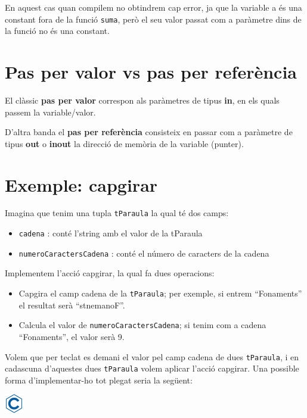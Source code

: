 \documentclass[]{book}
\providecommand{\tightlist}{%
  \setlength{\itemsep}{0pt}\setlength{\parskip}{0pt}}
\begin{document}
En aquest cas quan compilem no obtindrem cap error, ja que la variable a és una constant fora de la funció \texttt{suma}, però el seu valor passat com a paràmetre dins de la funció no és una constant.

\hypertarget{pas-per-valor-vs-pas-per-referencia}{%
\section{Pas per valor vs pas per referència}\label{pas-per-valor-vs-pas-per-referencia}}

El clàssic \textbf{pas per valor} correspon als paràmetres de tipus \textbf{in}, en els quals passem la variable/valor.

D'altra banda el \textbf{pas per referència} consisteix en passar com a paràmetre de tipus \textbf{out} o \textbf{inout} la direcció de memòria de la variable (punter).

\hypertarget{exemple-capgirar}{%
\section{Exemple: capgirar}\label{exemple-capgirar}}

Imagina que tenim una tupla \texttt{tParaula} la qual té dos camps:

\begin{itemize}
\tightlist
\item
  \texttt{cadena} : conté l'string amb el valor de la tParaula
\item
  \texttt{numeroCaractersCadena} : conté el número de caracters de la cadena
\end{itemize}

Implementem l'acció capgirar, la qual fa dues operacions:

\begin{itemize}
\tightlist
\item
  Capgira el camp cadena de la \texttt{tParaula}; per exemple, si entrem ``Fonaments'' el resultat serà ``stnemanoF''.
\item
  Calcula el valor de \texttt{numeroCaractersCadena}; si tenim com a cadena ``Fonaments'', el valor serà 9.
\end{itemize}

Volem que per teclat es demani el valor pel camp cadena de dues \texttt{tParaula}, i en cadascuna d'aquestes dues \texttt{tParaula} volem aplicar l'acció capgirar. Una possible forma d'implementar-ho tot plegat seria la següent:

\includegraphics{./img/c.png}
\end{document}
